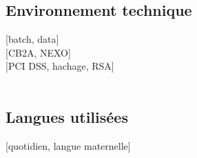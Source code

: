 {    \subsection{Environnement technique}
     [batch, data] \\
    [CB2A, NEXO]\\
    [PCI DSS, hachage, RSA]\\
       \\
     

    \subsection{Langues utilisées}
    [quotidien, langue maternelle]
}
\makebody
\clearpage


